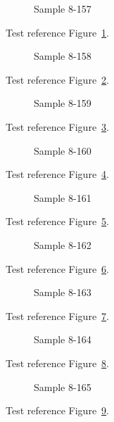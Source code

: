 \begin{figure}[tbhp]
\caption{Sample 8-157}
\label{fig:sample-8-157}
\end{figure}

Test reference Figure~\ref{fig:sample-8-157}.

\begin{figure}[tbhp]
\caption{Sample 8-158}
\label{fig:sample-8-158}
\end{figure}

Test reference Figure~\ref{fig:sample-8-158}.

\begin{figure}[tbhp]
\caption{Sample 8-159}
\label{fig:sample-8-159}
\end{figure}

Test reference Figure~\ref{fig:sample-8-159}.

\begin{figure}[tbhp]
\caption{Sample 8-160}
\label{fig:sample-8-160}
\end{figure}

Test reference Figure~\ref{fig:sample-8-160}.

\begin{figure}[tbhp]
\caption{Sample 8-161}
\label{fig:sample-8-161}
\end{figure}

Test reference Figure~\ref{fig:sample-8-161}.

\begin{figure}[tbhp]
\caption{Sample 8-162}
\label{fig:sample-8-162}
\end{figure}

Test reference Figure~\ref{fig:sample-8-162}.

\begin{figure}[tbhp]
\caption{Sample 8-163}
\label{fig:sample-8-163}
\end{figure}

Test reference Figure~\ref{fig:sample-8-163}.

\begin{figure}[tbhp]
\caption{Sample 8-164}
\label{fig:sample-8-164}
\end{figure}

Test reference Figure~\ref{fig:sample-8-164}.

\begin{figure}[tbhp]
\caption{Sample 8-165}
\label{fig:sample-8-165}
\end{figure}

Test reference Figure~\ref{fig:sample-8-165}.

